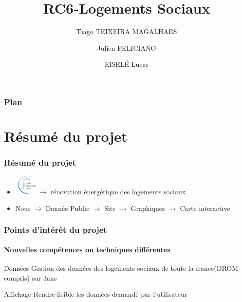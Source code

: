 \documentclass{beamer}
\title{RC6-Logements Sociaux}
\author{Tiago TEIXEIRA MAGALHAES \and Julien FELICIANO \and EISELÉ Lucas}
\institute[UCBL]
{
	Université Claude Bernard Lyon 1
}
\begin{document}
\maketitle


\begin{frame}%

\frametitle{Plan}
\tableofcontents

\end{frame}


\section{Résumé du projet}


\begin{frame} %
\frametitle{Résumé du projet}

	\begin{itemize} %
    \item \includegraphics[height=1cm]{Logo_Cec.jpg} $\rightarrow$ rénovation énergétique des logements sociaux
    \end{itemize}
    
    \medskip
    
    	\begin{itemize}%
    \item Nous $\rightarrow$ Donnée Public $\rightarrow$ Site $\rightarrow$ Graphiques $\rightarrow$ Carte interactive 
    \end{itemize}

\end{frame}


\begin{frame} %
\frametitle{Points d'intérêt du projet}
\framesubtitle{Nouvelles compétences ou techniques différentes}

	\begin{block}{Données}
	Gestion des données des logements sociaux de toute la france(DROM compris) sur 3ans
	\end{block}
	
	\begin{block}{Affichage}
	Rendre lisible les données demandé par l'utilisateur
	\end{block}

\end{frame}
\end{document}
